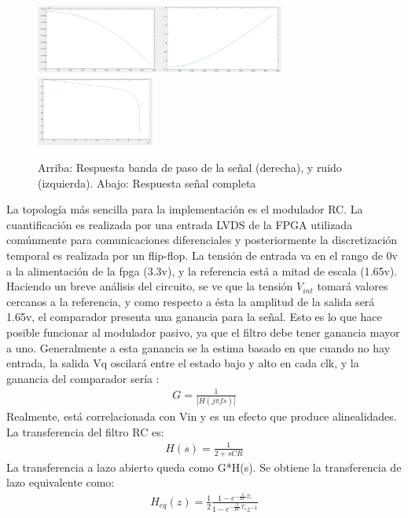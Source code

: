 \documentclass[a4paper,conference]{IEEEtran}
\begin{document}
\begin{figure}[!b]
\centering
\includegraphics[height=0.9in]{Respuesta_BP_Modulador_Combinada}
\centering
\includegraphics[height=0.9in]{Respuesta_Modulador_Completa}
\caption{Arriba: Respuesta banda de paso de la se\~nal (derecha), y ruido (izquierda). Abajo: Respuesta se\~nal completa}
\label{fig_5}
\end{figure}
La topolog\'ia m\'as sencilla para la implementaci\'on es el modulador RC. La cuantificaci\'on es realizada por una entrada LVDS de la FPGA utilizada com\'unmente para comunicaciones diferenciales y posteriormente la discretizaci\'on temporal es realizada por un flip-flop. La tensi\'on de entrada va en el rango de 0v a la alimentación de la fpga (3.3v), y la referencia está a mitad de escala (1.65v).  Haciendo un breve an\'alisis del circuito, se ve que la tensi\'on $V_{int}$ tomar\'a valores cercanos a la referencia, y como respecto a \'esta la amplitud de la salida ser\'a 1.65v, el comparador presenta una ganancia para la se\~nal. Esto es lo que hace posible funcionar al modulador pasivo, ya que el filtro debe tener ganancia mayor a uno. Generalmente a esta ganancia se la estima basado en que cuando no hay entrada, la salida Vq oscilar\'a entre el estado bajo y alto en cada clk, y la ganancia del comparador ser\'ia :
\begin{align}
G=\frac{1}{|H(j\pi fs)|}
\end{align}
Realmente, está correlacionada con Vin y es un efecto que produce alinealidades. La transferencia del filtro RC es:
\begin{align}
H(s)=\frac{1}{2+sCR}
\end{align}
La transferencia a lazo abierto queda como G*H(s). 
Se obtiene la transferencia de lazo equivalente como:
\begin{align}
H_{eq}(z)=\frac{1}{2}\frac{1-e^{-\frac{2}{RC}T_s}}{1-e^{-\frac{2}{RC}T_s}z^{-1}}
\end{align}
\end{document}
